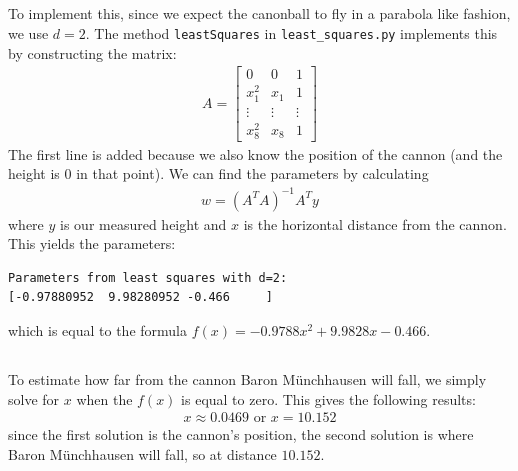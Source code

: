 \documentclass[a4paper]{article}
\begin{document}
\subsection{}
To implement this, since we expect the canonball to fly in a parabola like fashion, we use $d=2$. The method \texttt{leastSquares} in \texttt{least\_squares.py} implements this by constructing the matrix:
\begin{align*}
A =
\begin{bmatrix}
0 & 0 & 1 \\
x_1^2 & x_1 & 1 \\
\vdots & \vdots & \vdots \\
x_8^2 & x_ 8 & 1
\end{bmatrix}
\end{align*}
The first line is added because we also know the position of the cannon (and the height is $0$ in that point). We can find the parameters by calculating
\begin{align*}
w = (A^TA)^{-1}A^Ty
\end{align*}
where $y$ is our measured height and $x$ is the horizontal distance from the cannon. This yields the parameters:
\begin{verbatim}
Parameters from least squares with d=2:
[-0.97880952  9.98280952 -0.466     ]
\end{verbatim}
which is equal to the formula $f(x)=-0.9788x^2+9.9828x-0.466$.

\subsection{}
To estimate how far from the cannon Baron Münchhausen will fall, we simply solve for $x$ when the $f(x)$ is equal to zero. This gives the following results:
\begin{align*}
x\approx 0.0469 \mbox{  or  } x=10.152
\end{align*}
since the first solution is the cannon's position, the second solution is where Baron Münchhausen will fall, so at distance $10.152$.
\end{document}
